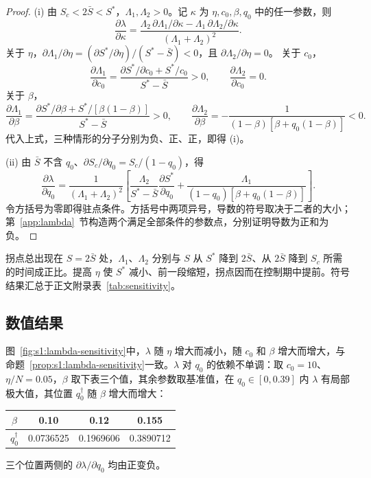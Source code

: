 \begin{proof}
(i) 由 $S_c<2\bar S<S^*$，$\Lambda_1,\Lambda_2>0$。记 $\kappa$ 为 $\eta,c_0,\beta,q_0$ 中的任一参数，则
\[
\frac{\partial\lambda}{\partial\kappa}
=\frac{\Lambda_2\,\partial\Lambda_1/\partial\kappa-\Lambda_1\,\partial\Lambda_2/\partial\kappa}{(\Lambda_1+\Lambda_2)^2}.
\]
关于 $\eta$，$\partial\Lambda_1/\partial\eta=(\partial S^*/\partial\eta)/(S^*-\bar S)<0$，且 $\partial\Lambda_2/\partial\eta=0$。
关于 $c_0$，
\[
\frac{\partial\Lambda_1}{\partial c_0}=
\frac{\partial S^*/\partial c_0+S^*/c_0}{S^*-\bar S}>0,
\qquad \frac{\partial\Lambda_2}{\partial c_0}=0.
\]
关于 $\beta$，
\[
\frac{\partial\Lambda_1}{\partial\beta}
=\frac{\partial S^*/\partial\beta+S^*/[\beta(1-\beta)]}{S^*-\bar S}>0,
\qquad
\frac{\partial\Lambda_2}{\partial\beta}
=-\frac1{(1-\beta)[\beta+q_0(1-\beta)]}<0.
\]
代入上式，三种情形的分子分别为负、正、正，即得 (i)。

(ii) 由 $\bar S$ 不含 $q_0$、$\partial S_c/\partial q_0=S_c/(1-q_0)$，得
\begin{equation}
\frac{\partial\lambda}{\partial q_0}
=\frac1{(\Lambda_1+\Lambda_2)^2}\left[
\frac{\Lambda_2}{S^*-\bar S}\frac{\partial S^*}{\partial q_0}
+\frac{\Lambda_1}{(1-q_0)[\beta+q_0(1-\beta)]}\right].
\label{eq:lambda-q0-sign}
\end{equation}
令方括号为零即得驻点条件。方括号中两项异号，导数的符号取决于二者的大小；第~\ref{app:lambda}~节构造两个满足全部条件的参数点，分别证明导数为正和为负。
\end{proof}

拐点总出现在 $S=2\bar S$ 处，$\Lambda_1$、$\Lambda_2$ 分别与 $S$ 从 $S^*$ 降到 $2\bar S$、从 $2\bar S$ 降到 $S_c$ 所需的时间成正比。提高 $\eta$ 使 $S^*$ 减小、前一段缩短，拐点因而在控制期中提前。符号结果汇总于正文附录表~\ref{tab:sensitivity}。

\subsection{数值结果}
图~\ref{fig:s1:lambda-sensitivity}中，$\lambda$ 随 $\eta$ 增大而减小，随 $c_0$ 和 $\beta$ 增大而增大，与命题~\ref{prop:s1:lambda-sensitivity}一致。$\lambda$ 对 $q_0$ 的依赖不单调：取 $c_0=10$、$\eta/N=0.05$，$\beta$ 取下表三个值，其余参数取基准值，在 $q_0\in[0,0.39]$ 内 $\lambda$ 有局部极大值，其位置 $q_0^\dagger$ 随 $\beta$ 增大而增大：
\begin{center}
\begin{tabular}{@{}cccc@{}}
\toprule
$\beta$ & 0.10 & 0.12 & 0.155\\
\midrule
$q_0^\dagger$ & 0.0736525 & 0.1969606 & 0.3890712\\
\bottomrule
\end{tabular}
\end{center}
三个位置两侧的 $\partial\lambda/\partial q_0$ 均由正变负。

